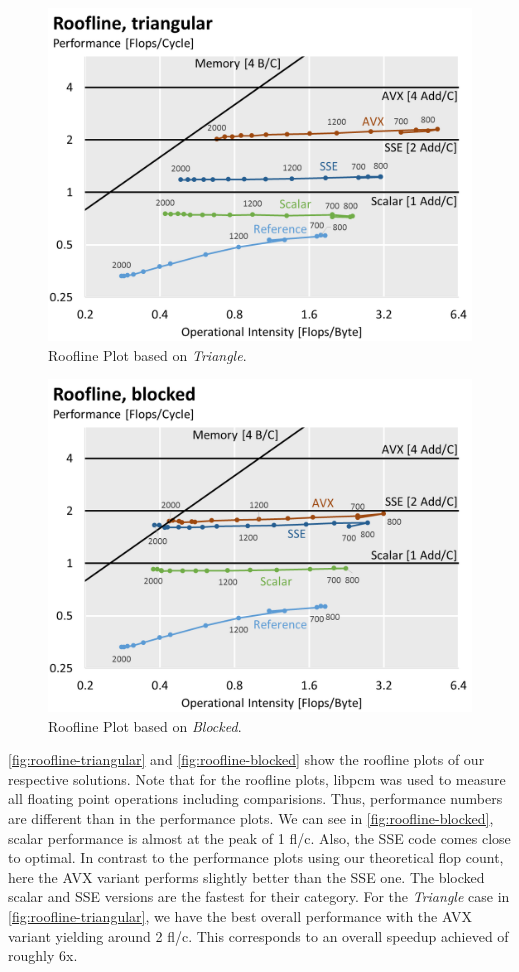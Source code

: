 \begin{figure}\centering
  \includegraphics[width=\linewidth]{roofline-data/roofline_triangular.png}
  \caption{Roofline Plot based on \emph{Triangle}.}
  \label{fig:roofline-triangular}
\end{figure}
\begin{figure}\centering
  \includegraphics[width=\linewidth]{roofline-data/roofline_blocked.png}
  \caption{Roofline Plot based on \emph{Blocked}.}
  \label{fig:roofline-blocked}
\end{figure}
\autoref{fig:roofline-triangular} and \autoref{fig:roofline-blocked} show
the roofline plots of our respective solutions. Note that for the roofline
plots, libpcm was used to measure all floating point operations including
comparisions. Thus, performance numbers are different than in the
performance plots. We can see in \autoref{fig:roofline-blocked}, scalar
performance is almost at the peak of 1 fl/c. Also, the SSE code comes close
to optimal. In contrast to the performance plots using our theoretical flop
count, here the AVX variant performs slightly better than the SSE one. The
blocked scalar and SSE versions are the fastest for their category. For the
\emph{Triangle} case in \autoref{fig:roofline-triangular}, we have the best
overall performance with the AVX variant yielding around 2 fl/c. This
corresponds to an overall speedup achieved of roughly 6x.
